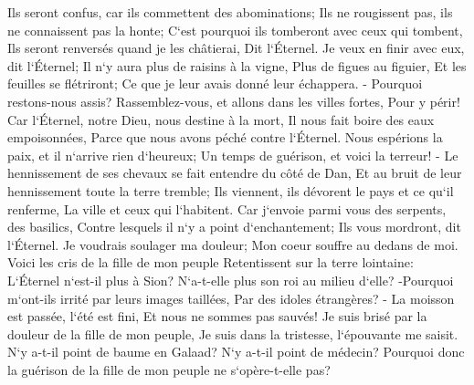 \verse Ils seront confus, car ils commettent des abominations; Ils ne rougissent pas, ils ne connaissent pas la honte; C`est pourquoi ils tomberont avec ceux qui tombent, Ils seront renversés quand je les châtierai, Dit l`Éternel. 
\verse Je veux en finir avec eux, dit l`Éternel; Il n`y aura plus de raisins à la vigne, Plus de figues au figuier, Et les feuilles se flétriront; Ce que je leur avais donné leur échappera. - 
\verse Pourquoi restons-nous assis? Rassemblez-vous, et allons dans les villes fortes, Pour y périr! Car l`Éternel, notre Dieu, nous destine à la mort, Il nous fait boire des eaux empoisonnées, Parce que nous avons péché contre l`Éternel. 
\verse Nous espérions la paix, et il n`arrive rien d`heureux; Un temps de guérison, et voici la terreur! - 
\verse Le hennissement de ses chevaux se fait entendre du côté de Dan, Et au bruit de leur hennissement toute la terre tremble; Ils viennent, ils dévorent le pays et ce qu`il renferme, La ville et ceux qui l`habitent. 
\verse Car j`envoie parmi vous des serpents, des basilics, Contre lesquels il n`y a point d`enchantement; Ils vous mordront, dit l`Éternel. 
\verse Je voudrais soulager ma douleur; Mon coeur souffre au dedans de moi. 
\verse Voici les cris de la fille de mon peuple Retentissent sur la terre lointaine: L`Éternel n`est-il plus à Sion? N`a-t-elle plus son roi au milieu d`elle? -Pourquoi m`ont-ils irrité par leurs images taillées, Par des idoles étrangères? - 
\verse La moisson est passée, l`été est fini, Et nous ne sommes pas sauvés! 
\verse Je suis brisé par la douleur de la fille de mon peuple, Je suis dans la tristesse, l`épouvante me saisit. 
\verse N`y a-t-il point de baume en Galaad? N`y a-t-il point de médecin? Pourquoi donc la guérison de la fille de mon peuple ne s`opère-t-elle pas? 

